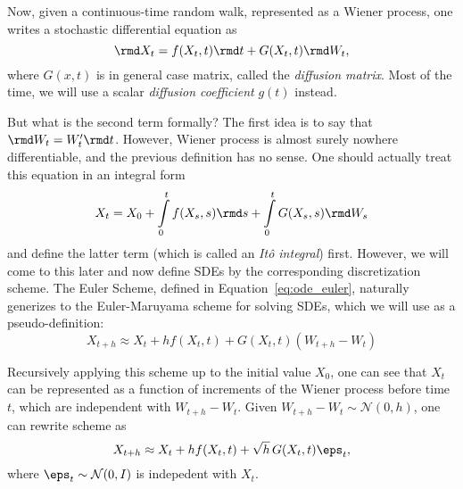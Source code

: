 Now, given a continuous-time random walk, represented as a Wiener process, one writes a stochastic differential equation as
\begin{equation}\label{eq:sde_matrix}
    \rmd X_t = f(X_t, t)\rmd t + G(X_t, t)\rmd W_t,
\end{equation}
where $G(x, t)$ is in general case matrix, called the \emph{diffusion matrix}. Most of the time, we will use a scalar \emph{diffusion coefficient} $g(t)$ instead.

But what is the second term formally? The first idea is to say that $\rmd W_t = W'_t \rmd t$. However, Wiener process is almost surely nowhere differentiable, and the previous definition has no sense. One should actually treat this equation in an integral form
\begin{equation}\label{eq:sde_matrix_int}
X_t = X_0 + \int\limits_{0}^{t}f(X_s, s)\rmd s + \int\limits_{0}^{t}G(X_s, s)\rmd W_s
\end{equation}
and define the latter term (which is called an \emph{Itô integral}) first. However, we will come to this later and now define SDEs by the corresponding discretization scheme. The Euler Scheme, defined in Equation~\ref{eq:ode_euler}, naturally generizes to the Euler-Maruyama scheme for solving SDEs, which we will use as a pseudo-definition:
\begin{equation}\label{eq:sde_euler_orig}
    X_{t + h} \approx X_t + h f(X_t, t) + G(X_t, t) (W_{t + h} - W_t)
\end{equation}

Recursively applying this scheme up to the initial value $X_0$, one can see that $X_t$ can be represented as a function of increments of the Wiener process before time $t$, which are independent with $W_{t + h} - W_t$. Given $W_{t + h} - W_{t} \sim \mathcal{N}(0, h)$, one can rewrite scheme as
\begin{equation}\label{eq:sde_euelr_maruyama}
    X_{t + h} \approx X_t + h f(X_t, t) + \sqrt{h}\, G(X_t, t)\eps_t,
\end{equation}
where $\eps_t \sim \mathcal{N}(0, I)$ is indepedent with $X_t$. 

